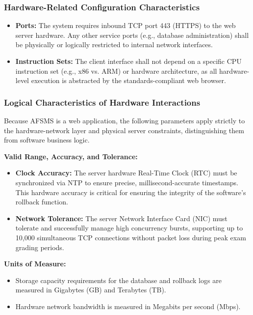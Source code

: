 \documentclass[11pt, a4paper]{article}
\begin{document}
\subsubsection{Hardware-Related Configuration Characteristics}
\begin{itemize}
    \item \textbf{Ports:} The system requires inbound TCP port 443 (HTTPS) to the web server hardware. Any other service ports (e.g., database administration) shall be physically or logically restricted to internal network interfaces.
    \item \textbf{Instruction Sets:} The client interface shall not depend on a specific CPU instruction set (e.g., x86 vs. ARM) or hardware architecture, as all hardware-level execution is abstracted by the standards-compliant web browser.
\end{itemize}

\subsubsection{Logical Characteristics of Hardware Interactions}
Because AFSMS is a web application, the following parameters apply strictly to the hardware-network layer and physical server constraints, distinguishing them from software business logic.

\textbf{Valid Range, Accuracy, and Tolerance:}
\begin{itemize}
    \item \textbf{Clock Accuracy:} The server hardware Real-Time Clock (RTC) must be synchronized via NTP to ensure precise, millisecond-accurate timestamps. This hardware accuracy is critical for ensuring the integrity of the software's rollback function.
    \item \textbf{Network Tolerance:} The server Network Interface Card (NIC) must tolerate and successfully manage high concurrency bursts, supporting up to 10,000 simultaneous TCP connections without packet loss during peak exam grading periods.
\end{itemize}

\textbf{Units of Measure:}
\begin{itemize}
    \item Storage capacity requirements for the database and rollback logs are measured in Gigabytes (GB) and Terabytes (TB).
    \item Hardware network bandwidth is measured in Megabits per second (Mbps).
\end{itemize}
\end{document}
